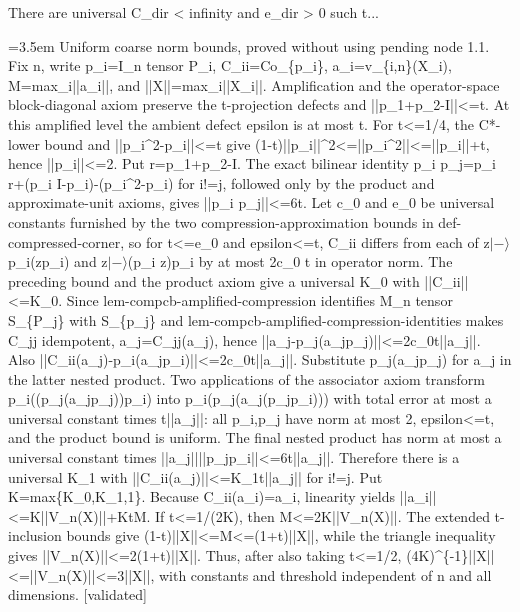 \documentclass{article}
\newcommand{\step}[1]{\par\noindent\hangindent=3.5em\hangafter=1%
  \makebox[3.5em][l]{\textbf{#1.}}}
\newcommand{\steptag}[1]{\hfill{\small\textsf{[#1]}}}
\begin{document}
\begin{proofbox}{There are universal C\_dir < infinity and e\_dir > 0 such t...}
\step{1.2.1} Uniform coarse norm bounds, proved without using pending node 1.1. Fix n, write p\_i=I\_n tensor P\_i, C\_ii=Co\_\{p\_i\}, a\_i=v\_\{i,n\}(X\_i), M=max\_i||a\_i||, and ||X||=max\_i||X\_i||. Amplification and the operator-space block-diagonal axiom preserve the t-projection defects and ||p\_1+p\_2-I||<=t. At this amplified level the ambient defect epsilon is at most t. For t<=1/4, the C*-lower bound and ||p\_i\textasciicircum{}2-p\_i||<=t give (1-t)||p\_i||\textasciicircum{}2<=||p\_i\textasciicircum{}2||<=||p\_i||+t, hence ||p\_i||<=2. Put r=p\_1+p\_2-I. The exact bilinear identity p\_i p\_j=p\_i r+(p\_i I-p\_i)-(p\_i\textasciicircum{}2-p\_i) for i!=j, followed only by the product and approximate-unit axioms, gives ||p\_i p\_j||<=6t. Let c\_0 and e\_0 be universal constants furnished by the two compression-approximation bounds in def-compressed-corner, so for t<=e\_0 and epsilon<=t, C\_ii differs from each of z$|-\rangle$p\_i(zp\_i) and z$|-\rangle$(p\_i z)p\_i by at most 2c\_0 t in operator norm. The preceding bound and the product axiom give a universal K\_0 with ||C\_ii||<=K\_0. Since lem-compcb-amplified-compression identifies M\_n tensor S\_\{P\_j\} with S\_\{p\_j\} and lem-compcb-amplified-compression-identities makes C\_jj idempotent, a\_j=C\_jj(a\_j), hence ||a\_j-p\_j(a\_jp\_j)||<=2c\_0t||a\_j||. Also ||C\_ii(a\_j)-p\_i(a\_jp\_i)||<=2c\_0t||a\_j||. Substitute p\_j(a\_jp\_j) for a\_j in the latter nested product. Two applications of the associator axiom transform p\_i((p\_j(a\_jp\_j))p\_i) into p\_i(p\_j(a\_j(p\_jp\_i))) with total error at most a universal constant times t||a\_j||: all p\_i,p\_j have norm at most 2, epsilon<=t, and the product bound is uniform. The final nested product has norm at most a universal constant times ||a\_j||||p\_jp\_i||<=6t||a\_j||. Therefore there is a universal K\_1 with ||C\_ii(a\_j)||<=K\_1t||a\_j|| for i!=j. Put K=max\{K\_0,K\_1,1\}. Because C\_ii(a\_i)=a\_i, linearity yields ||a\_i||<=K||V\_n(X)||+KtM. If t<=1/(2K), then M<=2K||V\_n(X)||. The extended t-inclusion bounds give (1-t)||X||<=M<=(1+t)||X||, while the triangle inequality gives ||V\_n(X)||<=2(1+t)||X||. Thus, after also taking t<=1/2, (4K)\textasciicircum{}\{-1\}||X||<=||V\_n(X)||<=3||X||, with constants and threshold independent of n and all dimensions. \steptag{validated} \\[4pt]

\end{proofbox}
\end{document}
